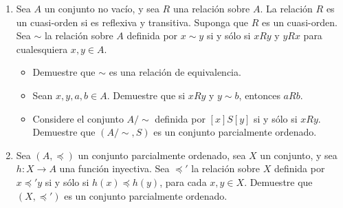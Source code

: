 \documentclass[letterpaper,11pt]{article}
\begin{document}
\begin{enumerate}
    \begin{proof} .
        \begin{itemize}
            \item Reflexividad. Sea $a ∈ ℕ$. Es claro que $a = a^{1}$, por lo 
            que $a \preceq a$.

            \item Antisimetría. Si $a \preceq b$ y $b \preceq a$ entonces 
            existen $r, s ∈ ℕ$ tales que $b = a^{r}$ y $a = b^{s}$. Sustituyendo
            el valor de $b$ de la primera expresión en la segunda obtenemos que 
            $a = (a^{r})^{s} = a^{rs}$, lo que implica que $rs = 1$. Como $r$ y 
            $s$ son naturales, entonces forzosamente $r = 1 = s$, por lo que 
            $a = b$. 

            \item Transitividad. Si $a \preceq b$ y $b \preceq c$ entonces 
            $b = a^{r}$ y $c = b^{s}$ para algunos $r, s ∈ ℕ$. Sustituyendo 
            el valor de $b$ de la  primer expresión en la segunda obtenemos que 
            $c = (a^{r})^{s}$ de donde $c = a^{r ⋅ s}$, lo que implica que 
            $a \preceq c$. 
        \end{itemize}

        El orden $\preceq$ no es total. Como $2 \not = 3$ y sólo estan
        permitidos los exponentes naturales, entonces no existe $k ∈ ℕ$ tal que 
        $2^{k} = 3$, o que $3^{k} = 2$, por lo que $2 \not \preceq 3$ y 
        $3 \not \preceq 2$. Así, $\preceq$ no es tricotómica, y por lo tanto, no 
        es un orden total.

    \end{proof}

    \item Sea $A$ un conjunto no vacío, y sea $R$ una relación sobre $A$. La 
    relación $R$ es un cuasi-orden si es reflexiva y transitiva. Suponga que 
    $R$ es un cuasi-orden. Sea $\sim$ la relación sobre $A$ definida por 
    $x \sim y$ si y sólo si $xRy$ y $yRx$ para cualesquiera $x, y \in A$.

    \begin{itemize}
        \item Demuestre que $\sim$ es una relación de equivalencia.
        \item Sean $x, y, a, b \in A$. Demuestre que si $xRy$  y $y \sim b$,
        entonces $aRb$.
        \item Considere el conjunto $A/\sim$ definida por $[x]S[y]$ si y sólo 
        si $xRy$. Demuestre que $(A/\sim, S)$ es un conjunto parcialmente
        ordenado.
    \end{itemize}

    \item Sea $(A, \preceq)$ un conjunto parcialmente ordenado, sea $X$ un 
    conjunto, y sea $h: X → A$ una función inyectiva. Sea $\preceq'$ la 
    relación sobre $X$ definida por $x \preceq' y$ si y sólo si $h(x) 
    \preceq h(y)$, para cada $x, y \in X$. Demuestre que $(X, \preceq')$ es 
    un conjunto parcialmente ordenado.
\end{enumerate}
\end{document}
